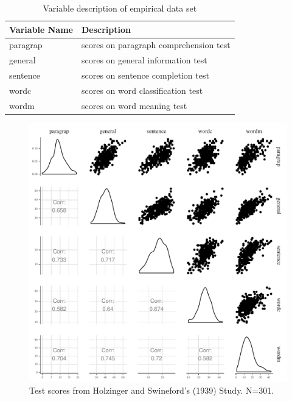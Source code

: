 \documentclass[11pt,a4paper,twoside]{book}
\begin{document}
\begin{table}
\centering
\caption{Variable description of empirical data set}
\begin{tabular}{l l}
  \toprule			
  Variable Name & Description  \\   \midrule  
  paragrap & scores on paragraph comprehension test  \\
  general & scores on general information test \\
  sentence & scores on sentence completion test\\
  wordc & scores on word classification test \\
  wordm & scores on word meaning test \\
  \bottomrule  
\end{tabular}
\label{table:hs.data}
\end{table}

\begin{figure}

{\centering \includegraphics[width=\textwidth-3cm]{figure/ch03_figunnamed-chunk-1-1} 

}

\caption[Test scores from Holzinger and Swineford's  (1939) Study]{Test scores from Holzinger and Swineford's  (1939) Study. N=301.}\label{fig:unnamed-chunk-1}
\end{figure}
\end{document}
